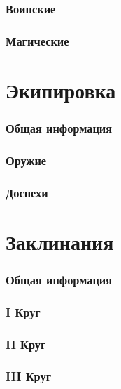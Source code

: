 \documentclass[10pt,twoside,twocolumn,openany]{book}
\begin{document}
\section{Воинские}
\lipsum[1]
\section{Магические}
\lipsum[1]

\part{Экипировка}
\section{Общая информация}
\lipsum[1]
\section{Оружие}
\lipsum[1]
\section{Доспехи}
\lipsum[1]

\part{Заклинания}
\section{Общая информация}
\lipsum[1]
\section{\textrm{I} Круг}
\lipsum[1]
\section{\textrm{II} Круг}
\lipsum[1]
\section{\textrm{III} Круг}
\lipsum[1]
\end{document}
